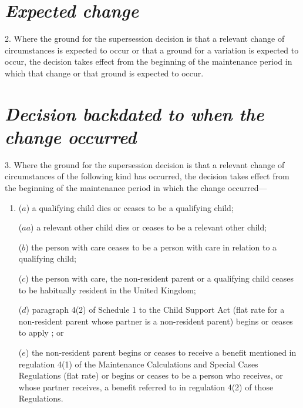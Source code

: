 \documentclass[12pt,a4paper]{article}
\begin{document}
\section*{\itshape Expected change}

2.  Where the ground for the supersession decision is that a relevant change of circumstances is expected to occur or that a ground for a variation is expected to occur, the decision takes effect from the beginning of the maintenance period in which that change or that ground is expected to occur.

\section*{\itshape Decision backdated to when the change occurred}

3.  Where the ground for the supersession decision is that a relevant change of circumstances of the following kind has occurred, the decision takes effect from the beginning of the maintenance period in which the change occurred—
\begin{enumerate}\item[]
($a$) a qualifying child dies or ceases to be a qualifying child;

($aa$) a relevant other child dies or ceases to be a relevant other child;

($b$) the person with care ceases to be a person with care in relation to a qualifying child;

($c$) the person with care, the non-resident parent or a qualifying child ceases to be habitually resident in the United Kingdom; 

($d$) paragraph 4(2) of Schedule 1 to the Child Support Act (flat rate for a non-resident parent whose partner is a non-resident parent) begins or ceases to apply%
%
; or

($e$) the non-resident parent begins or ceases to receive a benefit mentioned in regulation 4(1) of the Maintenance Calculations and Special Cases Regulations (flat rate) or begins or ceases to be a person who receives, or whose partner receives, a benefit referred to in regulation 4(2) of those Regulations.
\end{enumerate}

\end{document}
